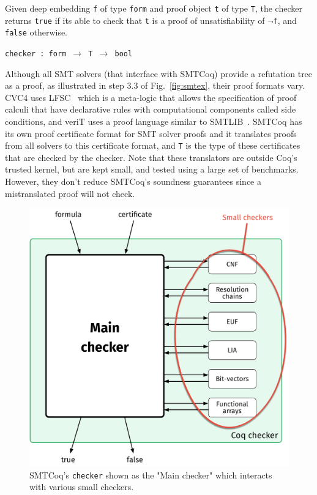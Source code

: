 \documentclass{article}
\begin{document}
	Given deep embedding 
	\texttt{f} of type \texttt{form}
	and proof object \texttt{t} of type 
	\texttt{T}, the checker returns 
	\texttt{true} if its able to 
	check that \texttt{t} is a proof
	of unsatisfiability of \texttt{$\neg$f},
	and \texttt{false} otherwise.
	\begin{center}
		\texttt{checker : form 
			$\to$ T $\to$ bool}	
	\end{center}
	Although all SMT solvers (that 
	interface with SMTCoq) provide a
	refutation tree as a proof, as 
	illustrated in step 3.3 of 
	Fig.~\ref{fig:smtex},
	their proof formats vary. CVC4 uses 
	LFSC~\cite{DBLP:journals/fmsd/StumpORHT13}
	which is a meta-logic that allows the 
	specification of proof calculi that have 
	declarative	rules with computational 
	components called side conditions, and 
	veriT uses a proof language similar to 
	SMTLIB~\cite{Besson1}. SMTCoq has its 
	own proof certificate format for SMT 
	solver proofs and it translates proofs 
	from all solvers to this certificate 
	format, and \texttt{T} is the type of 
	these certificates that are 
	checked by the checker. Note 
	that these translators are outside 
	Coq's trusted kernel, but are kept
	small, and tested using a large 
	set of benchmarks. However, they
	don't reduce SMTCoq's soundness
	guarantees since a mistranslated
	proof will not check.
	
	\begin{figure}[t]
		\begin{center}
			\includegraphics[scale=0.3]{checker}
			\caption{SMTCoq's \texttt{checker}
				shown as the "Main checker" which 
				interacts with various small checkers.}
			\label{fig:checker}
		\end{center}
	\end{figure}
	
\end{document}
